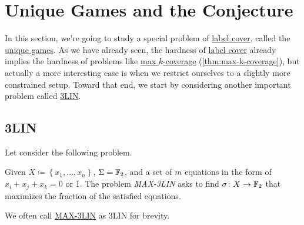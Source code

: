 \chapter{Unique Games and the Conjecture}

In this section, we're going to study a special problem of \hyperref[prb:label-cover]{label cover}, called the \hyperref[prb:unique-game]{unique games}. As we have already seen, the hardness of \hyperref[prb:label-cover]{label cover} already implies the hardness of problems like \hyperref[prb:max-k-coverage]{max \(k\)-coverage} (\autoref{thm:max-k-coverage}), but actually a more interesting case is when we restrict ourselves to a slightly more constrained setup. Toward that end, we start by considering another important problem called \hyperref[prb:max-3LIN]{3LIN}.
\section{3LIN}
Let consider the following problem.
\begin{problem}\label{prb:max-3LIN}
Given \(X\coloneqq \left\{ x_1, \ldots , x_n  \right\} \), \(\Sigma = \mathbb{\MakeUppercase{f}} _2\), and a set of \(m\) equations in the form of \(x_i + x_j + x_k = 0\) or \(1\). The problem \emph{MAX-3LIN} asks to find \(\sigma \colon X\to \mathbb{\MakeUppercase{f}} _2\) that maximizes the fraction of the satisfied equations.
\end{problem}

\begin{remark}
	We often call \hyperref[prb:max-3LIN]{MAX-3LIN} as 3LIN for brevity.
\end{remark}

